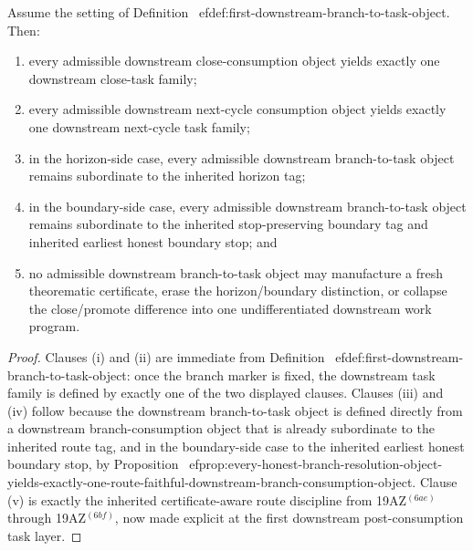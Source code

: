 \begin{proposition}
\label{prop:every-consumed-branch-yields-exactly-one-route-faithful-downstream-task-family}
Assume the setting of Definition~
ef{def:first-downstream-branch-to-task-object}. Then:
\begin{enumerate}[label=(
oman*)]
  \item every admissible downstream close-consumption object yields exactly one downstream close-task family;
  \item every admissible downstream next-cycle consumption object yields exactly one downstream next-cycle task family;
  \item in the horizon-side case, every admissible downstream branch-to-task object remains subordinate to the inherited horizon tag;
  \item in the boundary-side case, every admissible downstream branch-to-task object remains subordinate to the inherited stop-preserving boundary tag and inherited earliest honest boundary stop; and
  \item no admissible downstream branch-to-task object may manufacture a fresh theorematic certificate, erase the horizon/boundary distinction, or collapse the close/promote difference into one undifferentiated downstream work program.
\end{enumerate}
\end{proposition}

\begin{proof}
Clauses (i) and (ii) are immediate from Definition~
ef{def:first-downstream-branch-to-task-object}: once the branch marker is fixed, the downstream task family is defined by exactly one of the two displayed clauses. Clauses (iii) and (iv) follow because the downstream branch-to-task object is defined directly from a downstream branch-consumption object that is already subordinate to the inherited route tag, and in the boundary-side case to the inherited earliest honest boundary stop, by Proposition~
ef{prop:every-honest-branch-resolution-object-yields-exactly-one-route-faithful-downstream-branch-consumption-object}. Clause (v) is exactly the inherited certificate-aware route discipline from 19AZ$^{(6ae)}$ through 19AZ$^{(6bf)}$, now made explicit at the first downstream post-consumption task layer.
\end{proof}

